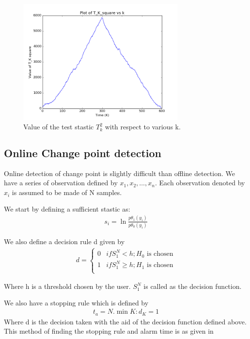 \documentclass{article}
\begin{document}
\begin{figure}[ht!]
  \centering
  \includegraphics[width=0.75\textwidth]{images/rd_offline/tk_sq}
  \caption{Value of the test stastic $ T_{k}^{2} $ with respect to various k.\label{fig:rd_tk_sq}}
\end{figure}


\subsection{Online Change point detection}
Online detection of change point is slightly difficult than offline detection. We have a series of observation defined by $x_{1}, x_{2}, \ldots, x_{n} $.  Each observation denoted by $x_{i}$ is assumed to be made of N samples.

We start by defining a sufficient stastic as:
\begin{align}
  s_{i} = \ln{\frac{p\theta_{1}(y_{i})}{p\theta_{0}(y_{i})}}
\end{align}

We also define a decision rule d given by
\begin{align}
  d = \begin{cases}
    0 & if S_{1}^{N} < h; H_{0} \text{~is chosen}\\
    1 & if S_{1}^{N} \ge h; H_{1} \text{~is chosen}\\
      \end{cases}
\end{align}

Where h is a threshold chosen by the user.  $S_{1}^{N}$ is called as the decision function.

We also have a stopping rule which is defined by 
\begin{align}
  t_{a} = N.\min{K : d_{K} = 1}
\end{align}
Where d is the decision taken with the aid of the decision function defined above.  This method of finding the stopping rule and alarm time is as given in\cite{basseville_nikiforov}
\end{document}
